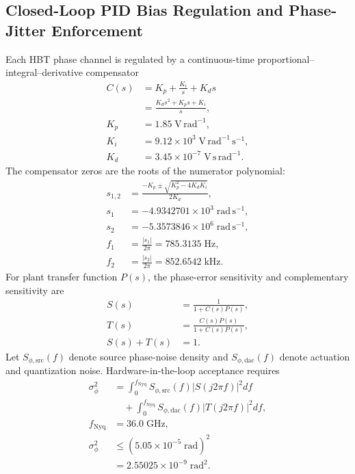 \documentclass[10pt,twocolumn]{IEEEtran}
\begin{document}
\subsection{Closed-Loop PID Bias Regulation and Phase-Jitter Enforcement}

Each HBT phase channel is regulated by a continuous-time proportional--integral--derivative compensator
\begin{equation}
\begin{aligned}
C(s)&=K_p+\frac{K_i}{s}+K_ds \\
&=\frac{K_ds^2+K_ps+K_i}{s}, \\
K_p&=1.85\;\mathrm{V\,rad^{-1}}, \\
K_i&=9.12\times10^3\;\mathrm{V\,rad^{-1}\,s^{-1}}, \\
K_d&=3.45\times10^{-7}\;\mathrm{V\,s\,rad^{-1}}.
\end{aligned}
\label{eq:pid_controller}
\end{equation}
The compensator zeros are the roots of the numerator polynomial:
\begin{equation}
\begin{aligned}
s_{1,2}&=\frac{-K_p\pm
\sqrt{K_p^2-4K_dK_i}}{2K_d}, \\
s_1&=-4.9342701\times10^3\;\mathrm{rad\,s^{-1}}, \\
s_2&=-5.3573846\times10^6\;\mathrm{rad\,s^{-1}}, \\
f_1&=\frac{|s_1|}{2\pi}=785.3135\;\mathrm{Hz}, \\
f_2&=\frac{|s_2|}{2\pi}=852.6542\;\mathrm{kHz}.
\end{aligned}
\label{eq:pid_zeros}
\end{equation}
For plant transfer function $P(s)$, the phase-error sensitivity and complementary sensitivity are
\begin{equation}
\begin{aligned}
S(s)&=\frac{1}{1+C(s)P(s)}, \\
T(s)&=\frac{C(s)P(s)}{1+C(s)P(s)}, \\
S(s)+T(s)&=1.
\end{aligned}
\label{eq:sensitivity_functions}
\end{equation}
Let $S_{\phi,\mathrm{src}}(f)$ denote source phase-noise density and $S_{\phi,\mathrm{dac}}(f)$ denote actuation and quantization noise. Hardware-in-the-loop acceptance requires
\begin{equation}
\begin{aligned}
\sigma_\phi^2
&=\int_{0}^{f_{\mathrm{Nyq}}}
S_{\phi,\mathrm{src}}(f)
\left|S(j2\pi f)\right|^2df \\
&\quad+\int_{0}^{f_{\mathrm{Nyq}}}
S_{\phi,\mathrm{dac}}(f)
\left|T(j2\pi f)\right|^2df, \\
f_{\mathrm{Nyq}}&=36.0\;\mathrm{GHz}, \\
\sigma_\phi^2&\leq
\left(5.05\times10^{-5}\;\mathrm{rad}\right)^2 \\
&=2.55025\times10^{-9}\;\mathrm{rad^2}.
\end{aligned}
\label{eq:phase_noise_integral}
\end{equation}
\end{document}
